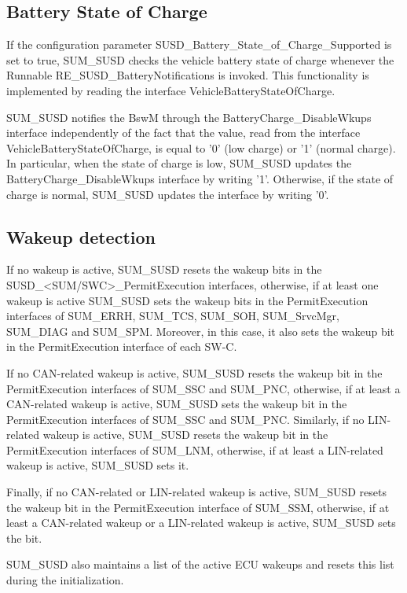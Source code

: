 \subsection{Battery State of Charge}
{If the configuration parameter SUSD\_Battery\_State\_of\_Charge\_Supported is set to true, SUM\_SUSD checks the vehicle battery state of charge whenever the Runnable RE\_SUSD\_BatteryNotifications is invoked.
This functionality is implemented by reading the interface VehicleBatteryStateOfCharge. 

SUM\_SUSD notifies the BswM through the BatteryCharge_DisableWkups interface independently of the fact that the value, read from the interface VehicleBatteryStateOfCharge, is equal to '0' (low charge) or '1' (normal charge).
In particular, when the state of charge is low, SUM\_SUSD updates the BatteryCharge_DisableWkups interface by writing '1'. Otherwise, if the state of charge is normal, SUM\_SUSD updates the interface by writing '0'.}
{}

\subsection{Wakeup detection}\label{sec:wake_updetection}
{If no wakeup is active, SUM\_SUSD resets the wakeup bits in the SUSD\_<SUM/SWC>\_PermitExecution interfaces, otherwise, if at least one wakeup is active SUM\_SUSD
sets the wakeup bits in the PermitExecution interfaces of SUM\_ERRH, SUM\_TCS, SUM\_SOH, SUM\_SrvcMgr, SUM\_DIAG and SUM\_SPM. Moreover, in this case, it also sets the wakeup bit in the 
PermitExecution interface of each SW-C. 

If no CAN-related wakeup is active, SUM\_SUSD resets the wakeup bit in the PermitExecution interfaces of SUM\_SSC and SUM\_PNC, 
otherwise, if at least a CAN-related wakeup is active, SUM\_SUSD sets the wakeup bit in the PermitExecution interfaces of SUM\_SSC and SUM\_PNC. Similarly,  
if no LIN-related wakeup is active, SUM\_SUSD resets the wakeup bit in the PermitExecution interfaces of SUM\_LNM, 
otherwise, if at least a LIN-related wakeup is active, SUM\_SUSD sets it. 

Finally, if no CAN-related or LIN-related wakeup is active, SUM\_SUSD resets the wakeup bit 
in the PermitExecution interface of SUM\_SSM, otherwise, if at least a CAN-related wakeup or a LIN-related wakeup is active, SUM\_SUSD sets the bit.

SUM\_SUSD also maintains a list of the active ECU wakeups and resets this list during the initialization.}
{ }\newline
{  }\newline 

